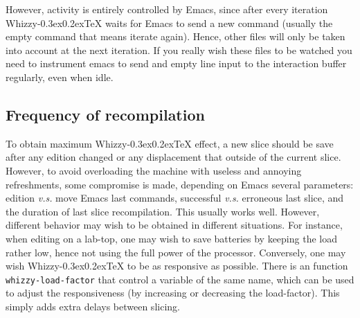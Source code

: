 \documentclass[12pt]{article}
\makeatletter
\let \lst \verb
\def \whizzy {{Whizzy\kern -0.3ex\raise 0.2ex\hbox{\let \@\relax\TeX}}}
\makeatother
\begin{document}
However, activity is entirely controlled by Emacs, since after every
iteration {\whizzy} waits for Emacs to send a new command (usually the empty
command that means iterate again). Hence, other files will only be taken
into account at the next iteration. If you really wish these files
to be watched you need to instrument emacs to send and empty line input to
the interaction buffer regularly, even when idle. 

\subsection {Frequency of recompilation} 

To obtain maximum {\whizzy} effect, a new slice should be save after any
edition changed or any displacement that outside of the current slice.
However, to avoid overloading the machine with useless and annoying
refreshments, some compromise is made, depending on Emacs several
parameters: edition {\em v.s.} move Emacs last commands, 
successful {\em v.s.} erroneous last slice, and the duration of last slice
recompilation. This usually works well. However, different behavior may wish
to be obtained in different situations. For instance, when editing on a
lab-top, one may wish to save batteries by keeping the load rather low, hence
not using the full power of the processor. Conversely, one may wish 
{\whizzy} to be as responsive as possible. There is an function
\lst"whizzy-load-factor" that control a variable of the same name, which can
be used to adjust the responsiveness (by increasing or decreasing the
load-factor). This simply adds extra delays between slicing. 
\end{document}
